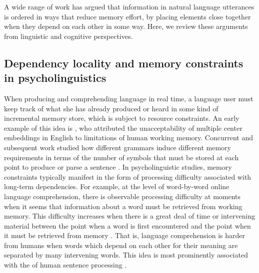 A wide range of work has argued that information in natural language utterances is ordered in ways that reduce memory effort, by placing elements close together when they depend on each other in some way. Here, we review these arguments from linguistic and cognitive perspectives.

\subsection{Dependency locality and memory constraints in psycholinguistics}

When producing and comprehending language in real time, a language user must keep track of what she has already produced or heard in some kind of incremental memory store, which is subject to resource constraints.
An early example of this idea is \citet{miller-finitary-1963}, who attributed the unacceptability of multiple center embeddings in English to limitations of human working memory.
Concurrent and subsequent work studied how different grammars induce different memory requirements in terms of the number of symbols that must be stored at each point to produce or parse a sentence \citep{yngve1960model,abney1991memory,gibson1991computational,resnik1992left}. 
In psycholinguistic studies, memory constraints typically manifest in the form of processing difficulty associated with long-term dependencies.
For example, at the level of word-by-word online language comprehension, there is observable processing difficulty at moments when it seems that information about a word must be retrieved from working memory. 
This difficulty increases when there is a great deal of time or intervening material between the point when a word is first encountered and the point when it must be retrieved from memory  \citep{gibson1998linguistic,gibson1999memory,gibson2000dependency,mcelree2000sentence,lewis-activation-based-2005,bartek-search-2011,nicenboim2015working,balling2017effects}. 
That is, language comprehension is harder from humans when words which depend on each other for their meaning are separated by many intervening words.
This idea is most prominently associated with the  of human sentence processing \citep{gibson2000dependency}.

